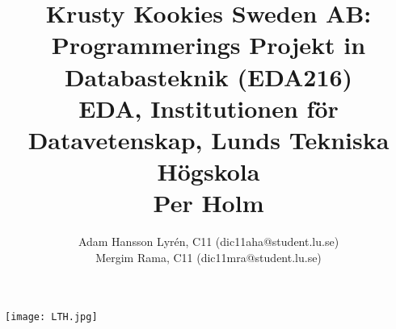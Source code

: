 \documentclass[a4paper]{article}%
\title{
	Krusty Kookies Sweden AB: Programmerings Projekt in Databasteknik (EDA216)\\
	EDA, Institutionen för Datavetenskap, Lunds Tekniska Högskola\\
	Per Holm}
\author{
Adam Hansson Lyrén, C11 (dic11aha@student.lu.se)\\
Mergim Rama, C11 (dic11mra@student.lu.se)\\
}
\begin{document}

\maketitle
\centerline{\texttt{[image: LTH.jpg]}}
\thispagestyle{empty}

\newpage
\setcounter{page}{1}


\tableofcontents
\newpage










\end{document}
